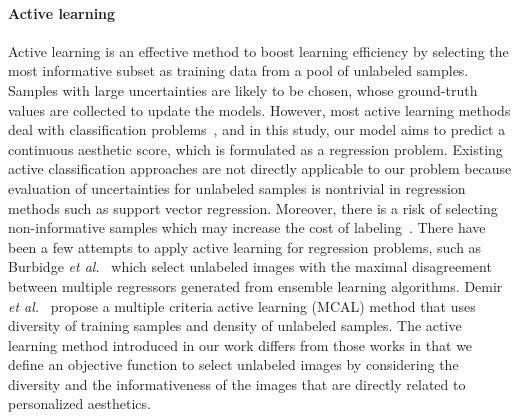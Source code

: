 \paragraph{Active learning}
Active learning is an effective method to boost learning efficiency by selecting the most informative subset as training data from a pool of unlabeled samples. 
Samples with large uncertainties are likely to be chosen, whose ground-truth values are collected to update the models. 
However, most active learning methods deal with classification problems~\cite{tong2001support1, schohn2000less, settles2010active},  and in this study, our model aims to predict a continuous aesthetic score, which is formulated as a regression problem. Existing active classification approaches are not directly applicable to our problem because evaluation of uncertainties for unlabeled samples is nontrivial in regression methods such as support vector regression. Moreover, there is a risk of selecting non-informative samples which may increase the cost of labeling~\cite{willett2005faster, demir2014multiple}.  There have been a few attempts to apply active learning for regression problems, such as Burbidge \textsl{et al.}~\cite{burbidge2007active} which select unlabeled images with the maximal disagreement between multiple regressors generated from ensemble learning algorithms. Demir \textsl{et al.}~\cite{demir2014multiple} propose a multiple criteria active learning (MCAL) method that uses diversity of training samples and density of unlabeled samples. The active learning method introduced in our work differs from those works in that we define an objective function to select unlabeled images by considering the diversity and the informativeness of the images that are directly related to personalized aesthetics.
